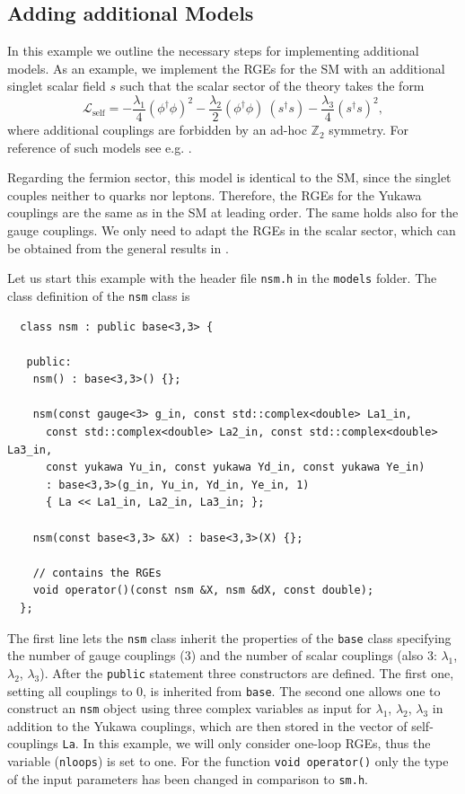 \documentclass[preprint,12pt]{elsarticle}
\begin{document}
\subsection{\label{sec::adding} Adding additional Models}
In this example we outline the necessary steps for implementing additional models. As an example, we implement the RGEs for the SM with an additional singlet scalar field $s$ such that the scalar sector of the theory takes the form
\begin{equation} \label{eq:nsm_la}
  \mathcal{L}_{\mathrm{self}} = -\frac{\lambda_1}{4} (\phi^\dagger\phi)^2  -\frac{\lambda_2}{2} (\phi^\dagger\phi)\ (s^\dagger s)   -\frac{\lambda_3}{4} (s^\dagger s)^2 ,
\end{equation}
where additional couplings are forbidden by an ad-hoc $\mathbb{Z}_2$ symmetry. For reference of such models see e.g. \cite{Schabinger:2005ei,Patt:2006fw,Bowen:2007ia}.

Regarding the fermion sector, this model is identical to the SM, since the singlet couples neither to quarks nor leptons. Therefore, the RGEs for the Yukawa couplings are the same as in the SM at leading order.
The same holds also for the gauge couplings. We only need to adapt the RGEs in the scalar sector, which can be obtained from the general results in \cite{Machacek:1984zw,Poole:2019kcm}.

Let us start this example with the header file \texttt{nsm.h} in the \texttt{models} folder. The class definition of the \texttt{nsm} class is
\begin{lstlisting}
  class nsm : public base<3,3> {
  
   public:
    nsm() : base<3,3>() {};

    nsm(const gauge<3> g_in, const std::complex<double> La1_in,
      const std::complex<double> La2_in, const std::complex<double> La3_in,
      const yukawa Yu_in, const yukawa Yd_in, const yukawa Ye_in)
      : base<3,3>(g_in, Yu_in, Yd_in, Ye_in, 1)
      { La << La1_in, La2_in, La3_in; };

    nsm(const base<3,3> &X) : base<3,3>(X) {};
 
    // contains the RGEs
    void operator()(const nsm &X, nsm &dX, const double);
  };
\end{lstlisting}
The first line lets the \texttt{nsm} class inherit the properties of the \texttt{base} class specifying the number of gauge couplings (3) and the number of scalar couplings (also 3: $\lambda_1$, $\lambda_2$, $\lambda_3$).
After the \texttt{public} statement three constructors are defined. The first one, setting all couplings to 0, is inherited from \texttt{base}.
The second one allows one to construct an \texttt{nsm} object using three complex variables as input for $\lambda_1$, $\lambda_2$, $\lambda_3$ in addition to the Yukawa couplings,
which are then stored in the vector of self-couplings \texttt{La}.
In this example, we will only consider one-loop RGEs, thus the variable (\texttt{nloops}) is set to one.
For the function \texttt{void operator()} only the type of the input parameters has been changed in comparison to \texttt{sm.h}.
\end{document}
